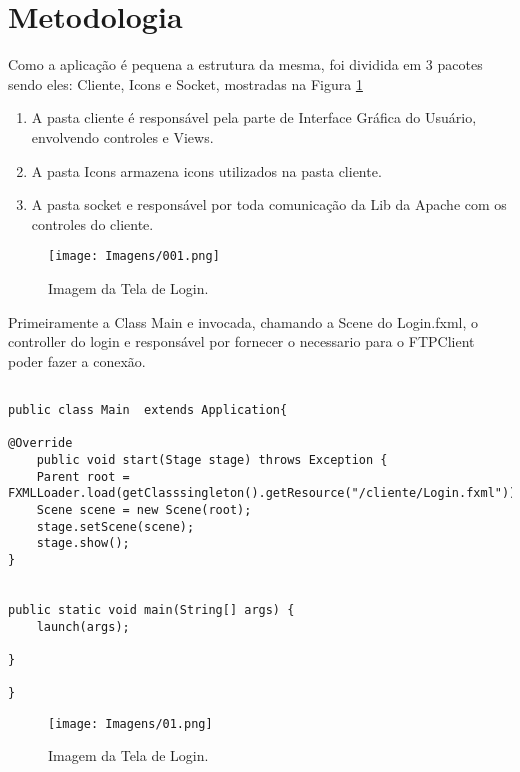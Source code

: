 \documentclass[12pt]{article}
\begin{document}
\section{Metodologia}
Como a aplicação é pequena a estrutura da mesma, foi dividida em 3 pacotes sendo eles: Cliente, Icons e Socket, mostradas na Figura \ref{fig:01}

\begin{enumerate}
	
\item{A pasta cliente é responsável pela parte de Interface Gráfica do Usuário, envolvendo controles e Views.}
\item{A pasta Icons armazena icons utilizados na pasta cliente.}
\item{A pasta socket e responsável por toda comunicação da Lib da Apache com os controles do cliente.}

\end{enumerate}

\begin{figure}[H]
	\centering
	\texttt{[image: Imagens/001.png]}
	\caption{ Imagem da Tela de Login.}
	\label{fig:01}
\end{figure}


Primeiramente a Class Main e invocada, chamando a Scene do Login.fxml, o controller do login e responsável por fornecer o necessario para o FTPClient poder fazer a conexão.

\begin{lstlisting}

public class Main  extends Application{

@Override
	public void start(Stage stage) throws Exception {
	Parent root = FXMLLoader.load(getClasssingleton().getResource("/cliente/Login.fxml"));
	Scene scene = new Scene(root);
	stage.setScene(scene);
	stage.show();
}


public static void main(String[] args) {
	launch(args);

}

}

\end{lstlisting}

\begin{figure}[H]
	\centering
	\texttt{[image: Imagens/01.png]}
	\caption{ Imagem da Tela de Login.}
	\label{fig:02}
\end{figure}
\end{document}
